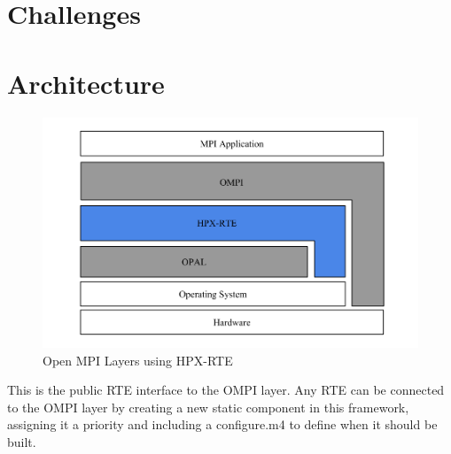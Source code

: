 \section{Challenges}
\label{sec:challenges}


\iffalse

\section{Architecture}
\label{sec:architecture}

\begin{figure}[ht]
\centering
\includegraphics[scale=0.45]{images/open-mpi-layers-hpx-rte.png}
\caption[Open MPI Layers using HPX-RTE]{Open MPI Layers using HPX-RTE}
\label{fig:open-mpi-layers-hpx-rte}
\end{figure}

 This is the public RTE interface to the OMPI layer. Any RTE can be
 connected to the OMPI layer by creating a new static component in
 this framework, assigning it a priority and including a configure.m4
 to define when it should be built.

